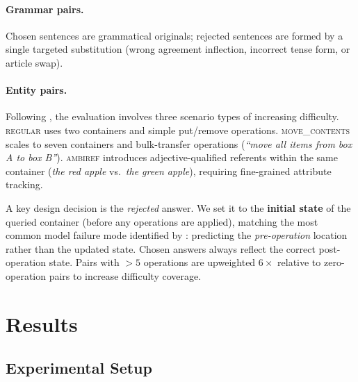 \documentclass[11pt]{article}
\begin{document}
\paragraph{Grammar pairs.}
Chosen sentences are grammatical originals;
rejected sentences are formed by a single targeted substitution
(wrong agreement inflection, incorrect tense form, or
article swap).

\paragraph{Entity pairs.}
Following \citet{kim-schuster-2023}, the evaluation involves
three scenario types of increasing difficulty.
\textsc{regular} uses two containers and simple put/remove operations.
\textsc{move\_contents} scales to seven containers and bulk-transfer
operations (\emph{``move all items from box A to box B''}).
\textsc{ambiref} introduces adjective-qualified referents within
the same container (\emph{the red apple} vs.\ \emph{the green apple}),
requiring fine-grained attribute tracking.

A key design decision is the \emph{rejected} answer.
We set it to the \textbf{initial state} of the queried container
(before any operations are applied),
matching the most common model failure mode identified by
\citet{kim-schuster-2023}: predicting the \emph{pre-operation}
location rather than the updated state.
Chosen answers always reflect the correct post-operation state.
Pairs with $>5$ operations are upweighted $6\times$ relative
to zero-operation pairs to increase difficulty coverage.

\section{Results}
\label{sec:results}

\subsection{Experimental Setup}
\end{document}
